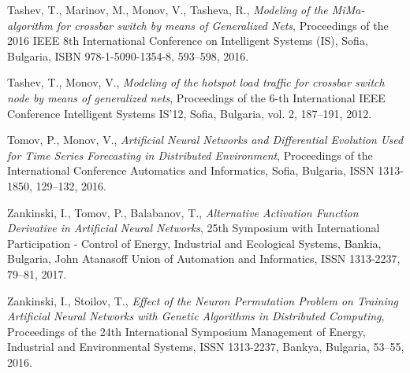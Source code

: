 \documentclass{llncs}
\begin{document}
\begin{thebibliography}{99}
 Tashev, T., Marinov, M., Monov, V., Tasheva, R., \textit{Modeling of the MiMa-algorithm for crossbar switch by means of Generalized Nets}, Proceedings of the 2016 IEEE 8th International Conference on Intelligent Systems (IS), Sofia, Bulgaria, ISBN 978-1-5090-1354-8, 593--598, 2016.

 Tashev, T., Monov, V., \textit{Modeling of the hotspot load traffic for crossbar switch node by means of generalized nets}, Proceedings of the 6-th International IEEE Conference Intelligent Systems IS'12, Sofia, Bulgaria, vol. 2, 187--191, 2012.

 Tomov, P., Monov, V., \textit{Artificial Neural Networks and Differential Evolution Used for Time Series Forecasting in Distributed Environment}, Proceedings of the International Conference Automatics and Informatics, Sofia, Bulgaria, ISSN 1313-1850, 129--132, 2016.

 Zankinski, I., Tomov, P., Balabanov, T., \textit{Alternative Activation Function Derivative in Artificial Neural Networks}, 25th Symposium with International Participation - Control of Energy, Industrial and Ecological Systems, Bankia, Bulgaria, John Atanasoff Union of Automation and Informatics, ISSN 1313-2237, 79--81, 2017.

 Zankinski, I., Stoilov, T., \textit{Effect of the Neuron Permutation Problem on Training Artificial Neural Networks with Genetic Algorithms in Distributed Computing}, Proceedings of the 24th International Symposium Management of Energy, Industrial and Environmental Systems, ISSN 1313-2237, Bankya, Bulgaria, 53--55, 2016.

\end{thebibliography}
\end{document}
